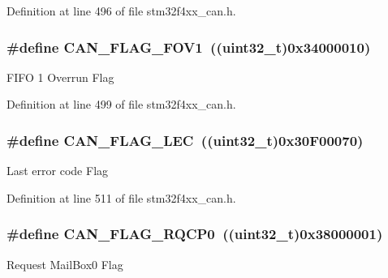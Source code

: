 Definition at line 496 of file stm32f4xx\-\_\-can.\-h.

\hypertarget{group___c_a_n__flags_gac1af6e61b1285ddc4658c4bcc152719a}{
\subsubsection[{C\-A\-N\-\_\-\-F\-L\-A\-G\-\_\-\-F\-O\-V1}]{\setlength{\rightskip}{0pt plus 5cm}\#define C\-A\-N\-\_\-\-F\-L\-A\-G\-\_\-\-F\-O\-V1~((uint32\-\_\-t)0x34000010)}}\label{group___c_a_n__flags_gac1af6e61b1285ddc4658c4bcc152719a}
F\-I\-F\-O 1 Overrun Flag 

Definition at line 499 of file stm32f4xx\-\_\-can.\-h.

\hypertarget{group___c_a_n__flags_ga73a774fa4d391aec0ea6552bf9372917}{
\subsubsection[{C\-A\-N\-\_\-\-F\-L\-A\-G\-\_\-\-L\-E\-C}]{\setlength{\rightskip}{0pt plus 5cm}\#define C\-A\-N\-\_\-\-F\-L\-A\-G\-\_\-\-L\-E\-C~((uint32\-\_\-t)0x30\-F00070)}}\label{group___c_a_n__flags_ga73a774fa4d391aec0ea6552bf9372917}
Last error code Flag 

Definition at line 511 of file stm32f4xx\-\_\-can.\-h.

\hypertarget{group___c_a_n__flags_ga6df0579049eb471720ea103c5446298b}{
\subsubsection[{C\-A\-N\-\_\-\-F\-L\-A\-G\-\_\-\-R\-Q\-C\-P0}]{\setlength{\rightskip}{0pt plus 5cm}\#define C\-A\-N\-\_\-\-F\-L\-A\-G\-\_\-\-R\-Q\-C\-P0~((uint32\-\_\-t)0x38000001)}}\label{group___c_a_n__flags_ga6df0579049eb471720ea103c5446298b}
Request Mail\-Box0 Flag 

